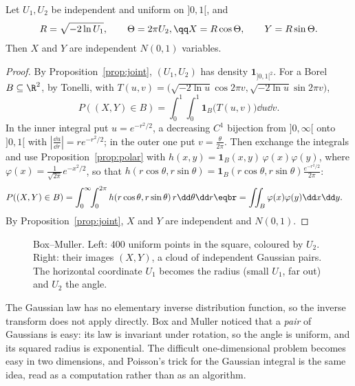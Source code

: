 \begin{theorem}\label{thm:boxmuller}
Let $U_1,U_2$ be independent and uniform on $]0,1[$, and
\[
\begin{gathered}R=\sqrt{-2\ln U_1},\qquad\Theta=2\pi U_2,\qq X=R\cos\Theta,\qquad Y=R\sin\Theta.\end{gathered}
\]
Then $X$ and $Y$ are independent $N(0,1)$ variables.
\end{theorem}
\begin{proof}
By Proposition~\ref{prop:joint}, $(U_1,U_2)$ has density $\mathbf 1_{]0,1[^2}$. For a Borel $B\subseteq\R^2$, by Tonelli,
with $T(u,v)=\bigl(\sqrt{-2\ln u}\cos2\pi v,\sqrt{-2\ln u}\sin2\pi v\bigr)$,
\[
P((X,Y)\in B)=\int_0^1\!\!\int_0^1\mathbf 1_B\bigl(T(u,v)\bigr)\dd u\dd v.
\]
In the inner integral put $u=e^{-r^2/2}$, a decreasing $C^1$ bijection from $]0,\infty[$ onto $]0,1[$ with $|\frac{\dd u}{\dd r}|=re^{-r^2/2}$; in the outer one put
$v=\frac\theta{2\pi}$. Then exchange the integrals and use Proposition~\ref{prop:polar} with $h(x,y)=\mathbf 1_B(x,y)\,\varphi(x)\varphi(y)$, where
$\varphi(x)=\frac1{\sqrt{2\pi}}e^{-x^2/2}$, so that $h(r\cos\theta,r\sin\theta)=\mathbf 1_B(r\cos\theta,r\sin\theta)\frac{e^{-r^2/2}}{2\pi}$:
\[
\begin{aligned}P((X,Y)\in B)&=\int_0^\infty\!\!\int_0^{2\pi}h(r\cos\theta,r\sin\theta)\,r\dd\theta\dd r\eqbr=\iint_B\varphi(x)\varphi(y)\dd x\dd y.\end{aligned}
\]
By Proposition~\ref{prop:joint}, $X$ and $Y$ are independent and $N(0,1)$.
\end{proof}

\begin{figure}[ht]
\centering
{}
\caption{Box--Muller. Left: $400$ uniform points in the square, coloured by $U_2$. Right: their images $(X,Y)$, a cloud of independent
Gaussian pairs. The horizontal coordinate $U_1$ becomes the radius (small $U_1$, far out) and $U_2$ the angle.}
\label{fig:boxmuller}
\end{figure}

\begin{beauty}
The Gaussian law has no elementary inverse distribution function, so the inverse transform does not apply directly.
Box and Muller noticed that a \emph{pair} of Gaussians is easy: its law is invariant under rotation, so the angle is
uniform, and its squared radius is exponential. The difficult one-dimensional problem becomes easy in two
dimensions, and Poisson's trick for the Gaussian integral is the same idea, read as a computation rather than as an
algorithm.
\end{beauty}

